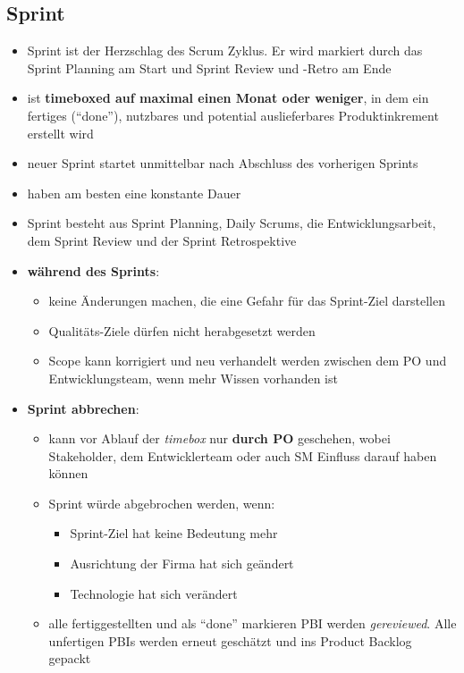 \subsection{Sprint}
\begin{itemize}
  \item Sprint ist der Herzschlag des Scrum Zyklus. Er wird markiert durch das Sprint Planning
    am Start und Sprint Review und -Retro am Ende
  \item ist \textbf{timeboxed auf maximal einen Monat oder weniger}, in dem ein
    fertiges (\enquote{done}), nutzbares und potential auslieferbares Produktinkrement erstellt wird
  \item neuer Sprint startet unmittelbar nach Abschluss des vorherigen Sprints
  \item haben am besten eine konstante Dauer
  \item Sprint besteht aus Sprint Planning, Daily Scrums, die Entwicklungsarbeit, dem
    Sprint Review und der Sprint Retrospektive
  \item \textbf{während des Sprints}:
    \begin{itemize}
      \item keine Änderungen machen, die eine Gefahr für das Sprint-Ziel darstellen
      \item Qualitäts-Ziele dürfen nicht herabgesetzt werden
      \item Scope kann korrigiert und neu verhandelt werden zwischen dem PO und Entwicklungsteam,
        wenn mehr Wissen vorhanden ist
    \end{itemize}
  \item \textbf{Sprint abbrechen}:
    \begin{itemize}
      \item kann vor Ablauf der \textit{timebox} nur \textbf{durch PO} geschehen, wobei Stakeholder, dem
        Entwicklerteam oder auch SM Einfluss darauf haben können
      \item Sprint würde abgebrochen werden, wenn:
        \begin{itemize}
          \item Sprint-Ziel hat keine Bedeutung mehr
          \item Ausrichtung der Firma hat sich geändert
          \item Technologie hat sich verändert
        \end{itemize}
      \item alle fertiggestellten und als \enquote{done} markieren PBI werden \textit{gereviewed}. Alle
        unfertigen PBIs werden erneut geschätzt und ins Product Backlog gepackt
    \end{itemize}
\end{itemize}


